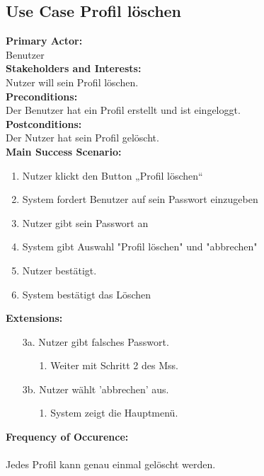 \documentclass[12pt,a4paper,onecolumn]{article}
\begin{document}
\subsection{Use Case Profil löschen}
\textbf{Primary Actor:}\\ Benutzer\\
\textbf{Stakeholders and Interests:}\\
Nutzer will sein Profil löschen.\\
\textbf{Preconditions:} \\ Der Benutzer hat ein Profil erstellt und ist eingeloggt.\\
\textbf{Postconditions:}\\Der Nutzer hat sein Profil gelöscht.\\
\textbf{Main Success Scenario:}
\begin{enumerate}
    \item Nutzer klickt den Button „Profil löschen“
    \item System fordert Benutzer auf sein Passwort einzugeben
    \item Nutzer gibt sein Passwort an
    \item System gibt Auswahl "Profil löschen" und "abbrechen"
    \item Nutzer bestätigt.
    \item System bestätigt das Löschen
\end{enumerate}
\textbf{Extensions:}
\begin{enumerate}
    \item [3a.]  Nutzer gibt falsches Passwort.
    \begin{enumerate}
        \item[1.]Weiter mit Schritt 2 des Mss.
    \end{enumerate}
    \item [3b.]  Nutzer wählt 'abbrechen' aus.
    \begin{enumerate}
        \item[1.]System zeigt die Hauptmenü.
    \end{enumerate}
\end{enumerate}
\textbf{Frequency of Occurence:}\\ \\
Jedes Profil kann genau einmal gelöscht werden. 
\end{document}
